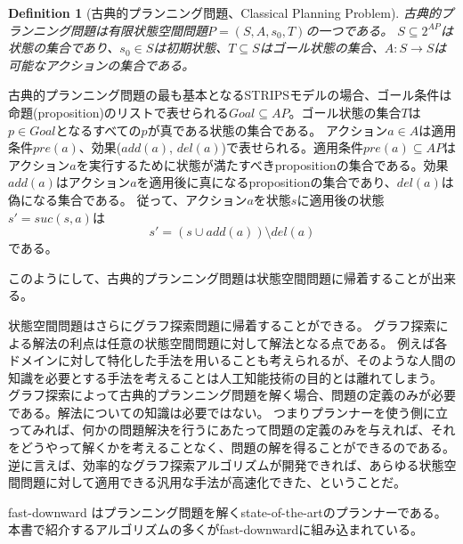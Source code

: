 \documentclass[10pt]{book}
\newtheorem{definition}{Definition}
\begin{document}
\begin{definition}[古典的プランニング問題、Classical Planning Problem]
古典的プランニング問題は有限状態空間問題$P = (S,A,s_0,T)$の一つである。
$S \subseteq 2^{AP}$は状態の集合であり、$s_0 \in S$は初期状態、$T \subseteq S$はゴール状態の集合、$A: S \rightarrow S$は可能なアクションの集合である。
\end{definition}

古典的プランニング問題の最も基本となるSTRIPSモデル\cite{fikes:71}の場合、ゴール条件は命題(proposition)のリストで表せられる$Goal \subseteq AP$。ゴール状態の集合$T$は$p \in Goal$となるすべての$p$が真である状態の集合である。
アクション$a \in A$は適用条件$pre(a)$、効果($add(a)$, $del(a)$)で表せられる。適用条件$pre(a) \subseteq AP$はアクション$a$を実行するために状態が満たすべきpropositionの集合である。効果$add(a)$はアクション$a$を適用後に真になるpropositionの集合であり、$del(a)$は偽になる集合である。
従って、アクション$a$を状態$s$に適用後の状態$s' = suc(s,a)$は
\begin{equation}
	s' = (s \cup add(a)) \setminus del(a)
\end{equation}
である。

このようにして、古典的プランニング問題は状態空間問題に帰着することが出来る。

状態空間問題はさらにグラフ探索問題に帰着することができる。
グラフ探索による解法の利点は任意の状態空間問題に対して解法となる点である。
例えば各ドメインに対して特化した手法を用いることも考えられるが、そのような人間の知識を必要とする手法を考えることは人工知能技術の目的とは離れてしまう。
グラフ探索によって古典的プランニング問題を解く場合、問題の定義のみが必要である。解法についての知識は必要ではない。
つまりプランナーを使う側に立ってみれば、何かの問題解決を行うにあたって問題の定義のみを与えれば、それをどうやって解くかを考えることなく、問題の解を得ることができるのである。
逆に言えば、効率的なグラフ探索アルゴリズムが開発できれば、あらゆる状態空間問題に対して適用できる汎用な手法が高速化できた、ということだ。

fast-downward \cite{helmert2006}はプランニング問題を解くstate-of-the-artのプランナーである。
本書で紹介するアルゴリズムの多くがfast-downwardに組み込まれている。


\end{document}
